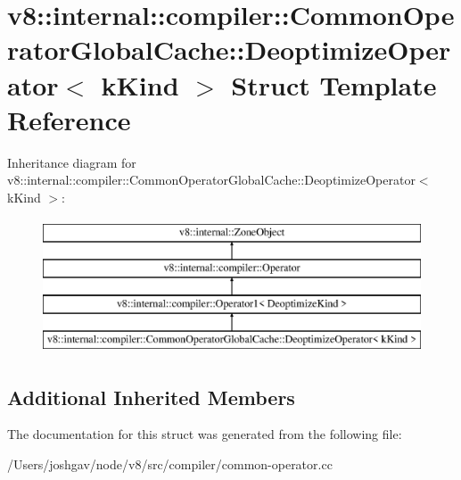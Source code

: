 \hypertarget{structv8_1_1internal_1_1compiler_1_1_common_operator_global_cache_1_1_deoptimize_operator}{}\section{v8\+:\+:internal\+:\+:compiler\+:\+:Common\+Operator\+Global\+Cache\+:\+:Deoptimize\+Operator$<$ k\+Kind $>$ Struct Template Reference}
\label{structv8_1_1internal_1_1compiler_1_1_common_operator_global_cache_1_1_deoptimize_operator}
Inheritance diagram for v8\+:\+:internal\+:\+:compiler\+:\+:Common\+Operator\+Global\+Cache\+:\+:Deoptimize\+Operator$<$ k\+Kind $>$\+:\begin{figure}[H]
\begin{center}
\leavevmode
\includegraphics[height=4.000000cm]{structv8_1_1internal_1_1compiler_1_1_common_operator_global_cache_1_1_deoptimize_operator}
\end{center}
\end{figure}
\subsection*{Additional Inherited Members}


The documentation for this struct was generated from the following file\+:\begin{DoxyCompactItemize}
\item 
/\+Users/joshgav/node/v8/src/compiler/common-\/operator.\+cc\end{DoxyCompactItemize}

